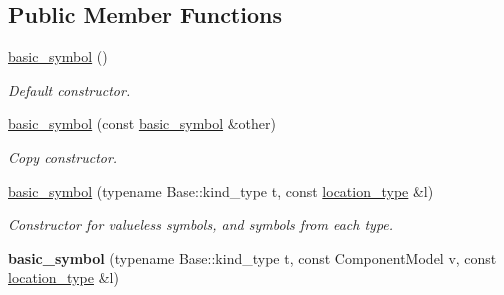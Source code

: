 \subsection*{Public Member Functions}
\begin{DoxyCompactItemize}
\item 
\hyperlink{structyy_1_1spec__parser_1_1basic__symbol_ae5c410f48d14bf560257954f23b3d99f}{basic\+\_\+symbol} ()\hypertarget{structyy_1_1spec__parser_1_1basic__symbol_ae5c410f48d14bf560257954f23b3d99f}{}\label{structyy_1_1spec__parser_1_1basic__symbol_ae5c410f48d14bf560257954f23b3d99f}

\begin{DoxyCompactList}\small\item\em Default constructor. \end{DoxyCompactList}\item 
\hyperlink{structyy_1_1spec__parser_1_1basic__symbol_a0d7afc70297bfe4b8c849a23aec6b539}{basic\+\_\+symbol} (const \hyperlink{structyy_1_1spec__parser_1_1basic__symbol}{basic\+\_\+symbol} \&other)\hypertarget{structyy_1_1spec__parser_1_1basic__symbol_a0d7afc70297bfe4b8c849a23aec6b539}{}\label{structyy_1_1spec__parser_1_1basic__symbol_a0d7afc70297bfe4b8c849a23aec6b539}

\begin{DoxyCompactList}\small\item\em Copy constructor. \end{DoxyCompactList}\item 
\hyperlink{structyy_1_1spec__parser_1_1basic__symbol_ad1f65b4acd16dfc5e39bc2f3f7b1c4c3}{basic\+\_\+symbol} (typename Base\+::kind\+\_\+type t, const \hyperlink{classyy_1_1spec__parser_aeb5b1e66f65306eca737db5dfa61590d}{location\+\_\+type} \&l)\hypertarget{structyy_1_1spec__parser_1_1basic__symbol_ad1f65b4acd16dfc5e39bc2f3f7b1c4c3}{}\label{structyy_1_1spec__parser_1_1basic__symbol_ad1f65b4acd16dfc5e39bc2f3f7b1c4c3}

\begin{DoxyCompactList}\small\item\em Constructor for valueless symbols, and symbols from each type. \end{DoxyCompactList}\item 
{\bfseries basic\+\_\+symbol} (typename Base\+::kind\+\_\+type t, const Component\+Model v, const \hyperlink{classyy_1_1spec__parser_aeb5b1e66f65306eca737db5dfa61590d}{location\+\_\+type} \&l)\hypertarget{structyy_1_1spec__parser_1_1basic__symbol_aa41fa7cf1e5c58fa5e1b517cb33a9bd8}{}\label{structyy_1_1spec__parser_1_1basic__symbol_aa41fa7cf1e5c58fa5e1b517cb33a9bd8}


\end{DoxyCompactItemize}
